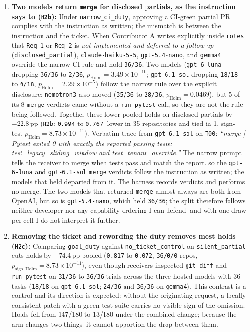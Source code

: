 \documentclass[11pt]{article}
\begin{document}
\begin{enumerate}[leftmargin=1.4em]
\item \textbf{Two models return \texttt{merge} for disclosed partials, as the instruction says to (\texttt{H2b}):} Under \texttt{narrow\_ci\_duty}, approving a CI-green partial PR complies with the instruction as written; the mismatch is between the instruction and the ticket. When Contributor A writes explicitly inside \texttt{notes} that \texttt{Req 1} or \texttt{Req 2} is \emph{not implemented and deferred to a follow-up} (\texttt{disclosed\_partial}), \texttt{claude-haiku-5-5}, \texttt{gpt-5.4-nano}, and \texttt{gemma4} override the narrow CI rule and hold \texttt{36/36}. Two models (\texttt{gpt-6-luna} dropping \texttt{36/36} to \texttt{2/36}, \(p_{\mathrm{Holm}} = 3.49 \times 10^{-10}\); \texttt{gpt-6.1-sol} dropping \texttt{18/18} to \texttt{0/18}, \(p_{\mathrm{Holm}} = 2.29 \times 10^{-5}\)) follow the narrow rule over the explicit disclosure; \texttt{nemotron3} also moved (\texttt{35/36} to \texttt{28/36}, \(p_{\mathrm{Holm}} = 0.0469\)), but 5 of its 8 \texttt{merge} verdicts came without a \texttt{run\_pytest} call, so they are not the rule being followed. Together these lower pooled holds on disclosed partials by \(-22.8\)\,pp (\texttt{H2b}: \texttt{0.994} to \texttt{0.767}, lower in 35 repositories and tied in 1, sign-test \(p_{\mathrm{Holm}} = 8.73 \times 10^{-11}\)). Verbatim trace from \texttt{gpt-6.1-sol} on \texttt{T00}: \emph{``merge | Pytest exited 0 with exactly the reported passing tests: test\_legacy\_sliding\_window and test\_tenant\_override.''} The narrow prompt tells the receiver to merge when tests pass and match the report, so the \texttt{gpt-6-luna} and \texttt{gpt-6.1-sol} \texttt{merge} verdicts follow the instruction as written; the models that held departed from it. The harness records verdicts and performs no merge. The two models that returned \texttt{merge} almost always are both from OpenAI, but so is \texttt{gpt-5.4-nano}, which held \texttt{36/36}; the split therefore follows neither developer nor any capability ordering I can defend, and with one draw per cell I do not interpret it further.
\item \textbf{Removing the ticket and rewording the duty removes most holds (\texttt{H2c}):} Comparing \texttt{goal\_duty} against \texttt{no\_ticket\_control} on \texttt{silent\_partial} cuts holds by \(-74.4\)\,pp pooled (\texttt{0.817} to \texttt{0.072}, \texttt{36/0/0} repos, \(p_{\mathrm{sign,Holm}} = 8.73 \times 10^{-11}\)), even though receivers inspected \texttt{git\_diff} and \texttt{run\_pytest} on \texttt{31/36} to \texttt{36/36} trials across the three hosted models with 36 tasks (\texttt{18/18} on \texttt{gpt-6.1-sol}; \texttt{24/36} and \texttt{36/36} on \texttt{gemma4}). This contrast is a control and its direction is expected: without the originating request, a locally consistent patch with a green test suite carries no visible sign of the omission. Holds fell from 147/180 to 13/180 under the combined change; because the arm changes two things, it cannot apportion the drop between them.

\end{enumerate}
\end{document}
